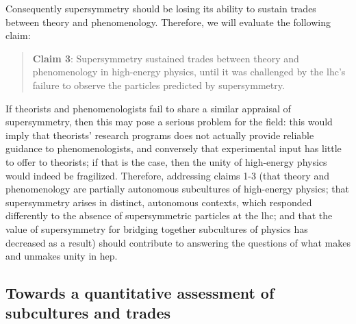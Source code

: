 \documentclass[smallextended]{svjour3}
\begin{document}
Consequently supersymmetry should be losing its ability to sustain trades between theory and phenomenology. Therefore, we will evaluate the following claim:
 
\begin{quote}
    \textbf{Claim 3}: Supersymmetry sustained trades between theory and phenomenology in high-energy physics, until it was challenged by the \gls{lhc}'s failure to observe the particles predicted by supersymmetry.
\end{quote}

If theorists and phenomenologists fail to share a similar appraisal of supersymmetry, then this may pose a serious problem for the field: this would imply that theorists' research programs does not actually provide reliable guidance to phenomenologists, and conversely that experimental input has little to offer to theorists; if that is the case, then the unity of high-energy physics would indeed be fragilized. Therefore, addressing  claims 1-3 (that theory and phenomenology are partially autonomous subcultures of high-energy physics; that supersymmetry arises in distinct, autonomous contexts, which responded differently to the absence of supersymmetric particles at the \gls{lhc}; and that the value of supersymmetry for bridging together subcultures of physics has decreased as a result) should contribute to answering the questions of what makes and unmakes unity in \gls{hep}.%

\subsection{Towards a quantitative assessment of subcultures and trades}
\label{section:quantitative}
\end{document}
